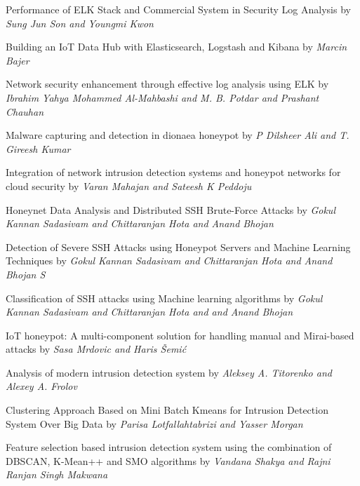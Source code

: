 \documentclass{report}
\begin{document}
\begin{thebibliography}{9}



  Performance of ELK Stack and Commercial System in Security Log Analysis by \textit{ Sung Jun Son and Youngmi Kwon}
 
Building an IoT Data Hub with Elasticsearch, Logstash and Kibana by \textit{ Marcin Bajer}

Network security enhancement through effective log analysis using ELK by \textit{ Ibrahim Yahya Mohammed Al-Mahbashi and M. B. Potdar and Prashant Chauhan}


Malware capturing and detection in dionaea honeypot by \textit{ P Dilsheer Ali and T. Gireesh Kumar}


Integration of network intrusion detection systems and honeypot networks for cloud security by \textit{ Varan Mahajan and Sateesh K Peddoju}


  Honeynet Data Analysis and Distributed SSH Brute-Force Attacks by \textit{Gokul Kannan Sadasivam and Chittaranjan Hota and Anand Bhojan}
  
  Detection of Severe SSH Attacks using Honeypot Servers and Machine Learning Techniques by \textit{Gokul Kannan Sadasivam and Chittaranjan Hota and Anand Bhojan S}


  Classification of SSH attacks using Machine learning algorithms  by \textit{Gokul Kannan Sadasivam and Chittaranjan Hota and and Anand Bhojan}
  

IoT honeypot: A multi-component solution for handling manual and Mirai-based attacks by \textit{ Sasa Mrdovic and Haris Šemić}


Analysis of modern intrusion detection system by \textit{ Aleksey A. Titorenko and Alexey A. Frolov}

Clustering Approach Based on Mini Batch Kmeans for Intrusion Detection System Over Big Data by \textit{ Parisa Lotfallahtabrizi and Yasser Morgan}

Feature selection based intrusion detection system using the combination of DBSCAN, K-Mean++ and SMO algorithms by \textit{ Vandana Shakya and Rajni Ranjan Singh Makwana}



\end{thebibliography}
\end{document}
